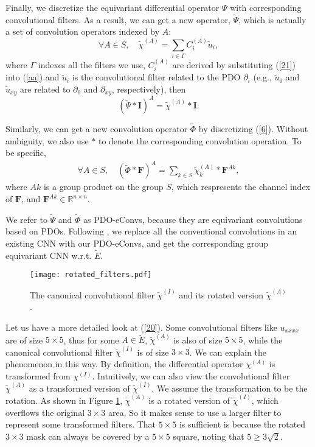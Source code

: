 \documentclass{article}
\begin{document}
Finally, we discretize the equivariant differential operator $\Psi$ with corresponding convolutional filters. As a result, we can get a new operator, $\tilde{\Psi}$, which is actually a set of convolution operators indexed by $A$:
\begin{equation}
\forall A\in S, \quad \tilde{\chi}^{(A)}=\sum_{i\in \Gamma} C^{(A)}_i \tilde u_i, \label{20}
\end{equation}
where $\Gamma$ indexes all the filters we use, $C_i^{(A)}$ are derived by substituting (\ref{21}) into (\ref{aa}) and $\tilde u_i$ is the convolutional filter related to the PDO $\partial_i$ (e.g., $\tilde u_0$ and $\tilde u_{xy}$ are related to $\partial_0$ and $\partial_{xy}$, respectively), then 
\begin{equation}
(\widetilde{\Psi}\ast \bm{I})^A=\tilde{\chi}^{(A)}\ast \bm{I}.
\end{equation}

Similarly, we can get a new convolution operator $\tilde{\Phi}$ by discretizing (\ref{6}). Without ambiguity, we also use $*$ to denote the corresponding convolution operation. To be specific,
\begin{align}
\forall A\in S, \quad \left(\tilde{\Phi}\ast \bm{F}\right)^A=\sum\limits_{k\in S}\tilde{\chi}^{(A)}_k \ast \bm{F}^{Ak},\label{Phiconv}
\end{align}
where $Ak$ is a group product on the group $S$, which respresents the channel index of $\bm{F}$, and $\bm{F}^{Ak}\in \mathbb{R}^{n\times n}$.

We refer to $\tilde{\Psi}$ and $\tilde{\Phi}$ as PDO-eConvs, because they are equivariant convolutions based on PDOs. Following \cite{cohen2016group}, we replace all the conventional convolutions in an existing CNN with our PDO-eConvs, and get the corresponding group equivariant CNN w.r.t. $\tilde{E}$.

\begin{figure}[t]
	\centering
	\texttt{[image: rotated\_filters.pdf]} \caption{The canonical convolutional filter $\tilde\chi^{(I)}$ and its rotated version $\tilde\chi^{(A)}$.}
	\label{filters}
\end{figure}
Let us have a more detailed look at (\ref{20}). Some convolutional filters like $u_{xxxx}$ are of size $5\times 5$, thus for some $A\in \tilde{E}$, $\tilde{\chi}^{(A)}$ is also of size $5\times 5$, while the canonical convolutional filter $\tilde{\chi}^{(I)}$ is of size $3\times 3$. We can explain the phenomenon in this way. By definition, the differential operator $\chi^{(A)}$ is transformed from $\chi^{(I)}$. Intuitively, we can also view the convolutional filter $\tilde{\chi}^{(A)}$ as a transformed version of $\tilde{\chi}^{(I)}$. We assume the transformation to be the rotation. As shown in Figure \ref{filters}, $\tilde \chi^{(A)}$ is a rotated version of $\tilde\chi^{(I)}$, which overflows the original $3\times 3$ area. So it makes sense to use a larger filter to represent some transformed filters.
That $5\times5$ is sufficient is because the rotated $3\times3$ mask can always be covered by a $5\times5$ square, noting that $5 \geq 3\sqrt{2}$.
\end{document}
